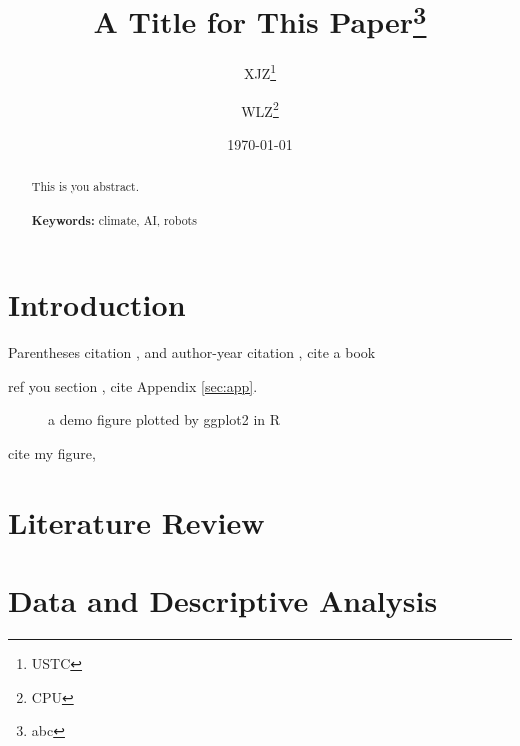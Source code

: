 \documentclass[a4paper, 12pt]{article}
\begin{document}
\begin{titlepage}
    \title{A Title for This Paper\thanks{abc}}
    \author{XJZ\thanks{USTC} \and WLZ\thanks{CPU}}
    \date{\today}
    \maketitle
    \begin{abstract}
        \noindent
        \onehalfspacing %
        This is you abstract.
        \\
        \vspace{0in}\\
        \noindent\textbf{Keywords:} climate, AI, robots\\
        \bigskip
    \end{abstract}
    \setcounter{page}{0}
    \thispagestyle{empty}
\end{titlepage}
\pagebreak \newpage
\doublespacing

\section{Introduction}\label{sec:intro}
Parentheses citation \citep{DunningHuchetteLubin2017}, and author-year citation \citet{DunningHuchetteLubin2017}, cite a book \citep[\S 2.1.1]{DunningHuchetteLubin2017}

ref you section , cite Appendix \ref{sec:app}.
\begin{figure}[!htbp]
    \centering
    
    \caption{a demo figure plotted by ggplot2 in R}
    \label{fig:demo}
\end{figure}
cite my figure, 

\begin{figure}[!htbp]
    \centering
    
\end{figure}


\section{Literature Review}
\section{Data and Descriptive Analysis}
\end{document}
